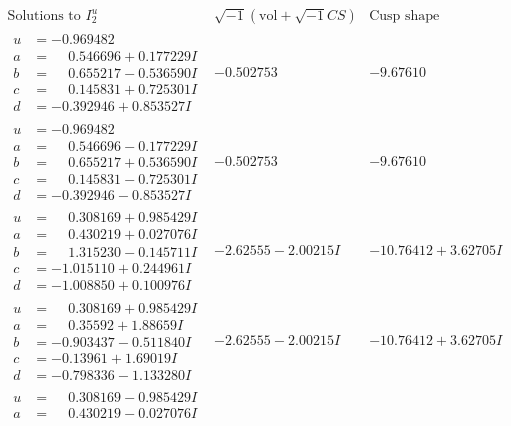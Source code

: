 \documentclass[1p]{elsarticle_modified}
\theoremstyle{definition}
\newcommand{\I}{\sqrt{-1}}
\begin{document}
$$\begin{array}{c|c|c}  
\text{Solutions to }I^u_{2}& \I (\text{vol} + \sqrt{-1}CS) & \text{Cusp shape}\\
 \hline 
\begin{aligned}
u &= -0.969482\phantom{ +0.000000I} \\
a &= \phantom{-}0.546696 + 0.177229 I \\
b &= \phantom{-}0.655217 - 0.536590 I \\
c &= \phantom{-}0.145831 + 0.725301 I \\
d &= -0.392946 + 0.853527 I\end{aligned}
 & -0.502753\phantom{ +0.000000I} & -9.67610\phantom{ +0.000000I} \\ \hline\begin{aligned}
u &= -0.969482\phantom{ +0.000000I} \\
a &= \phantom{-}0.546696 - 0.177229 I \\
b &= \phantom{-}0.655217 + 0.536590 I \\
c &= \phantom{-}0.145831 - 0.725301 I \\
d &= -0.392946 - 0.853527 I\end{aligned}
 & -0.502753\phantom{ +0.000000I} & -9.67610\phantom{ +0.000000I} \\ \hline\begin{aligned}
u &= \phantom{-}0.308169 + 0.985429 I \\
a &= \phantom{-}0.430219 + 0.027076 I \\
b &= \phantom{-}1.315230 - 0.145711 I \\
c &= -1.015110 + 0.244961 I \\
d &= -1.008850 + 0.100976 I\end{aligned}
 & -2.62555 - 2.00215 I & -10.76412 + 3.62705 I \\ \hline\begin{aligned}
u &= \phantom{-}0.308169 + 0.985429 I \\
a &= \phantom{-}0.35592 + 1.88659 I \\
b &= -0.903437 - 0.511840 I \\
c &= -0.13961 + 1.69019 I \\
d &= -0.798336 - 1.133280 I\end{aligned}
 & -2.62555 - 2.00215 I & -10.76412 + 3.62705 I \\ \hline\begin{aligned}
u &= \phantom{-}0.308169 - 0.985429 I \\
a &= \phantom{-}0.430219 - 0.027076 I \\

\end{aligned}
\end{array}$$
\end{document}
